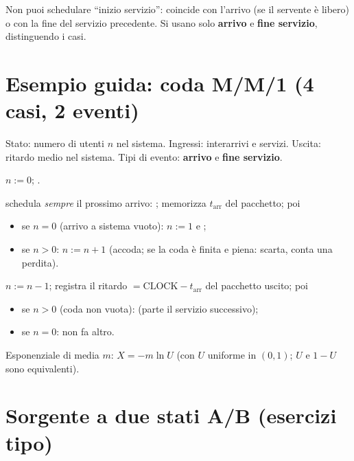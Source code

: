 \begin{attenzione}
Non puoi schedulare ``inizio servizio'': coincide con l'arrivo (se il servente è libero) o con la fine del servizio precedente. Si usano solo \textbf{arrivo} e \textbf{fine servizio}, distinguendo i casi.
\end{attenzione}

\section{Esempio guida: coda M/M/1 (4 casi, 2 eventi)}

Stato: numero di utenti $n$ nel sistema. Ingressi: interarrivi e servizi. Uscita: ritardo medio nel sistema. Tipi di evento: \textbf{arrivo} e \textbf{fine servizio}.

\begin{procedura}
\begin{description}[leftmargin=*,nosep]
\item[Inizializzazione] $n:=0$; .
\item[Arrivo] schedula \emph{sempre} il prossimo arrivo: ; memorizza $t_{\text{arr}}$ del pacchetto; poi
 \begin{itemize}[nosep]
 \item se $n=0$ (arrivo a sistema vuoto): $n:=1$ e ;
 \item se $n>0$: $n:=n+1$ (accoda; se la coda è finita e piena: scarta, conta una perdita).
 \end{itemize}
\item[Fine servizio] $n:=n-1$; registra il ritardo $=\text{CLOCK}-t_{\text{arr}}$ del pacchetto uscito; poi
 \begin{itemize}[nosep]
 \item se $n>0$ (coda non vuota):  (parte il servizio successivo);
 \item se $n=0$: non fa altro.
 \end{itemize}
\end{description}
\end{procedura}
Esponenziale di media $m$: $X=-m\ln U$ (con $U$ uniforme in $(0,1)$; $U$ e $1-U$ sono equivalenti).

\section{Sorgente a due stati A/B (esercizi tipo)}\label{cap5-sorgente}


